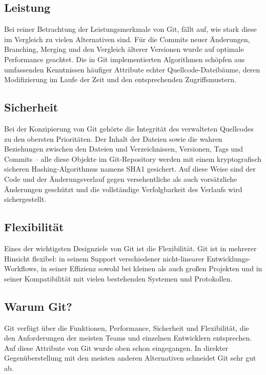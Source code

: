 \subsection{Leistung}

Bei reiner Betrachtung der Leistungsmerkmale von Git, fällt auf, wie stark diese im Vergleich zu vielen Alternativen sind. Für die Commits neuer 
Änderungen, Branching, Merging und den Vergleich älterer Versionen wurde auf optimale Performance geachtet. Die in Git implementierten Algorithmen schöpfen 
aus umfassenden Kenntnissen häufiger Attribute echter Quellcode-Dateibäume, deren Modifizierung im Laufe der Zeit und den entsprechenden Zugriffsmustern.
\cite{sysarch-git-1}

\subsection{Sicherheit}

Bei der Konzipierung von Git gehörte die Integrität des verwalteten Quellcodes zu den obersten Prioritäten. Der Inhalt der Dateien sowie die wahren Beziehungen 
zwischen den Dateien und Verzeichnissen, Versionen, Tags und Commits – alle diese Objekte im Git-Repository werden mit einem kryptografisch sicheren Hashing-Algorithmus namens SHA1 gesichert. 
Auf diese Weise sind der Code und der Änderungsverlauf gegen versehentliche als auch vorsätzliche Änderungen geschützt und die vollständige Verfolgbarkeit des Verlaufs wird sichergestellt.
\cite{sysarch-git-1}

\subsection{Flexibilität}

Eines der wichtigsten Designziele von Git ist die Flexibilität. Git ist in mehrerer Hinsicht flexibel: in seinem Support verschiedener nicht-linearer Entwicklungs-Workflows, 
in seiner Effizienz sowohl bei kleinen als auch großen Projekten und in seiner Kompatibilität mit vielen bestehenden Systemen und Protokollen.
\cite{sysarch-git-1}

\subsection{Warum Git?}

Git verfügt über die Funktionen, Performance, Sicherheit und Flexibilität, die den Anforderungen der meisten Teams und einzelnen Entwicklern entsprechen. 
Auf diese Attribute von Git wurde oben schon eingegangen. In direkter Gegenüberstellung mit den meisten anderen Alternativen schneidet Git sehr gut ab.
\cite{sysarch-git-1}

